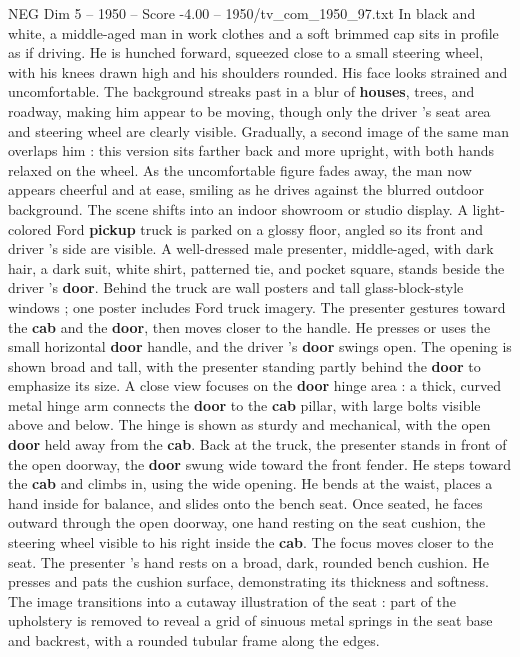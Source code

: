 \begin{textsample}{NEG Dim 5 – 1950 – Score -4.00 – 1950/tv\_com\_1950\_97.txt}  \label{ex:f5_neg_021}
In black and white, a middle-aged man in work clothes and a soft brimmed cap sits in profile as if driving.
He is hunched forward, squeezed close to a small steering wheel, with his knees drawn high and his shoulders rounded.
His face looks strained and uncomfortable.
The background streaks past in a blur of \textbf{houses}, trees, and roadway, making him appear to be moving, though only the driver ’s seat area and steering wheel are clearly visible.
Gradually, a second image of the same man overlaps him : this version sits farther back and more upright, with both hands relaxed on the wheel.
As the uncomfortable figure fades away, the man now appears cheerful and at ease, smiling as he drives against the blurred outdoor background.
The scene shifts into an indoor showroom or studio display.
A light-colored Ford \textbf{pickup} truck is parked on a glossy floor, angled so its front and driver ’s side are visible.
A well-dressed male presenter, middle-aged, with dark hair, a dark suit, white shirt, patterned tie, and pocket square, stands beside the driver ’s \textbf{door}.
Behind the truck are wall posters and tall glass-block-style windows ; one poster includes Ford truck imagery.
The presenter gestures toward the \textbf{cab} and the \textbf{door}, then moves closer to the handle.
He presses or uses the small horizontal \textbf{door} handle, and the driver ’s \textbf{door} swings open.
The opening is shown broad and tall, with the presenter standing partly behind the \textbf{door} to emphasize its size.
A close view focuses on the \textbf{door} hinge area : a thick, curved metal hinge arm connects the \textbf{door} to the \textbf{cab} pillar, with large bolts visible above and below.
The hinge is shown as sturdy and mechanical, with the open \textbf{door} held away from the \textbf{cab}.
Back at the truck, the presenter stands in front of the open doorway, the \textbf{door} swung wide toward the front fender.
He steps toward the \textbf{cab} and climbs in, using the wide opening.
He bends at the waist, places a hand inside for balance, and slides onto the bench seat.
Once seated, he faces outward through the open doorway, one hand resting on the seat cushion, the steering wheel visible to his right inside the \textbf{cab}.
The focus moves closer to the seat.
The presenter ’s hand rests on a broad, dark, rounded bench cushion.
He presses and pats the cushion surface, demonstrating its thickness and softness.
The image transitions into a cutaway illustration of the seat : part of the upholstery is removed to reveal a grid of sinuous metal springs in the seat base and backrest, with a rounded tubular frame along the edges.

\end{textsample}
